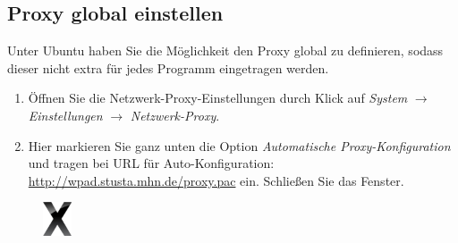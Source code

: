\documentclass[a4paper,12pt]{scrartcl}
\begin{document}
\subsection*{Proxy global einstellen} Unter Ubuntu haben Sie die Möglichkeit den Proxy global zu definieren, sodass dieser nicht extra für jedes Programm eingetragen werden.
\begin{enumerate}
	\item Öffnen Sie die Netzwerk-Proxy-Einstellungen durch Klick auf \emph{System} $\rightarrow$ \emph{Einstellungen} $\rightarrow$ \emph{Netzwerk-Proxy}.
	\item Hier markieren Sie ganz unten die Option \emph{Automatische Proxy-Konfiguration} und tragen bei URL für Auto-Konfiguration: \url{http://wpad.stusta.mhn.de/proxy.pac} ein. Schließen Sie das Fenster. 
\end{enumerate}



\newpage
\enlargethispage{20pt}



\begin{figure}[t!]
	\raggedleft
	\vspace{-20pt}
	\includegraphics[height=1cm,keepaspectratio]{Bilder/OSXLeopard}
	\vspace{-30pt}
\end{figure}
\end{document}
